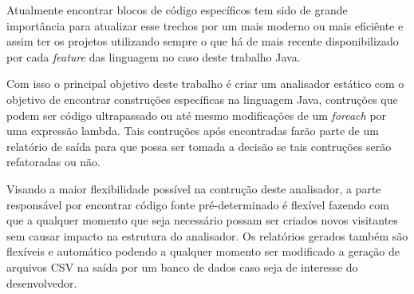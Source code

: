 Atualmente encontrar blocos de código específicos tem sido de grande importância para atualizar esse trechos por um mais moderno ou mais eficiênte e assim ter os projetos utilizando sempre o que há de mais recente disponibilizado por cada \textit{feature} das linguagem no caso deste trabalho Java.

Com isso o principal objetivo deste trabalho é criar um analisador estático com o objetivo de encontrar construções específicas na linguagem Java, contruções que podem ser código ultrapassado ou até mesmo modificações de um \textit{foreach} por uma expressão lambda. Tais contruções após encontradas farão parte de um relatório de saída para que possa ser tomada a decisão se tais contruções serão refatoradas ou não.

Visando a maior flexibilidade possível na contrução deste analisador, a parte responsável por encontrar código fonte pré-determinado é flexível fazendo com que a qualquer momento que seja necessário possam ser criados novos visitantes sem causar impacto na estrutura do analisador. Os relatórios gerados também são flexíveis e automático podendo a qualquer momento ser modificado a geração de arquivos CSV na saída por um banco de dados caso seja de interesse do desenvolvedor.

